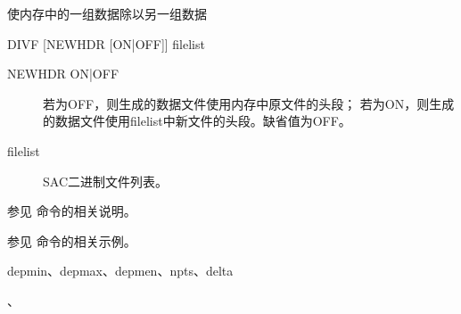 \label{cmd:divf}

使内存中的一组数据除以另一组数据

\begin{SACSTX}
DIVF [NEWHDR [ON|OFF]] filelist
\end{SACSTX}

\begin{description}
\item [NEWHDR ON|OFF] 若为OFF，则生成的数据文件使用内存中原文件的头段；
    若为ON，则生成的数据文件使用filelist中新文件的头段。缺省值为OFF。
\item [filelist] SAC二进制文件列表。
\end{description}

参见  命令的相关说明。

参见  命令的相关示例。

depmin、depmax、depmen、npts、delta

、
